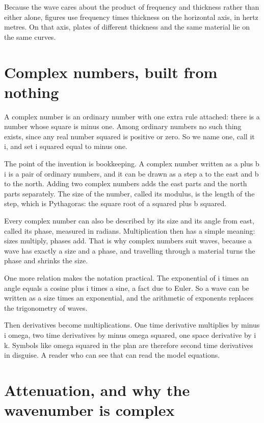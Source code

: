 \documentclass[11pt]{article}
\begin{document}
Because the wave cares about the product of frequency and thickness rather than either alone, figures use
frequency times thickness on the horizontal axis, in hertz metres. On that axis, plates of different
thickness and the same material lie on the same curves.

\section{Complex numbers, built from nothing}

A complex number is an ordinary number with one extra rule attached: there is a number whose square is minus
one. Among ordinary numbers no such thing exists, since any real number squared is positive or zero. So we
name one, call it i, and set i squared equal to minus one.

The point of the invention is bookkeeping. A complex number written as a plus b i is a pair of ordinary
numbers, and it can be drawn as a step a to the east and b to the north. Adding two complex numbers adds the
east parts and the north parts separately. The size of the number, called its modulus, is the length of the
step, which is Pythagoras: the square root of a squared plus b squared.

Every complex number can also be described by its size and its angle from east, called its phase, measured in
radians. Multiplication then has a simple meaning: sizes multiply, phases add. That is why complex numbers
suit waves, because a wave has exactly a size and a phase, and travelling through a material turns the phase
and shrinks the size.

One more relation makes the notation practical. The exponential of i times an angle equals a cosine plus i
times a sine, a fact due to Euler. So a wave can be written as a size times an exponential, and the arithmetic
of exponents replaces the trigonometry of waves.

Then derivatives become multiplications. One time derivative multiplies by minus i omega, two time
derivatives by minus omega squared, one space derivative by i k. Symbols like omega squared in the plan are
therefore second time derivatives in disguise. A reader who can see that can read the model equations.

\section{Attenuation, and why the wavenumber is complex}
\end{document}

